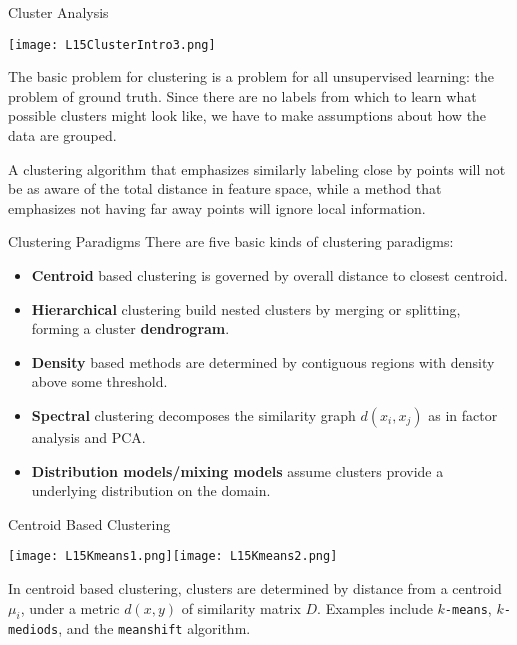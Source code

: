 \documentclass[10pt, table, dvipsnames,xcdraw,handout]{beamer}
\begin{document}
\begin{frame}[fragile]{Cluster Analysis}
  \begin{minipage}[t][0.5\textheight][t]{\textwidth}
	\centering \texttt{[image: L15ClusterIntro3.png]} 
  \end{minipage}
  \vfill
\begin{minipage}[t][0.5\textheight][t]{\textwidth}
The basic problem for clustering is a problem for all unsupervised learning: the problem of ground truth. Since there are no labels from which to learn what possible clusters might look like, we have to make assumptions about how the data are grouped. \pause

A clustering algorithm that emphasizes similarly labeling close by points will not be as aware of the total distance in feature space, while a method that emphasizes not having far away points will ignore local information. 
\end{minipage}
\end{frame}



\begin{frame}[fragile]{Clustering Paradigms}
There are five basic kinds of clustering paradigms: 
\begin{itemize}
\item[] \textbf{Centroid} based clustering is governed by overall distance to closest centroid.\pause
\item[] \textbf{Hierarchical} clustering build nested clusters by merging or splitting, forming a cluster \textbf{dendrogram}.\pause
\item[] \textbf{Density} based methods are determined by contiguous regions with density above some threshold.\pause
\item[] \textbf{Spectral} clustering decomposes the similarity graph $d(x_i,x_j)$ as in factor analysis and PCA.\pause
\item[] \textbf{Distribution models/mixing models} assume clusters provide a underlying distribution on the domain.
\end{itemize}
\end{frame}

\begin{frame}[fragile]{Centroid Based Clustering}
  \begin{minipage}[t][0.5\textheight][t]{\textwidth}
	\centering \texttt{[image: L15Kmeans1.png]}\hspace{1em}\texttt{[image: L15Kmeans2.png]} 
  \end{minipage}
  \vfill
\begin{minipage}[t][0.5\textheight][t]{\textwidth}
In centroid based clustering, clusters are determined by distance from a centroid $\mu_i$, under a metric $d(x,y)$ of similarity matrix $D$. \pause Examples include \texttt{$k$-means}, \texttt{$k$-mediods}, and the \texttt{meanshift} algorithm. 
\end{minipage}
\end{frame}
\end{document}
